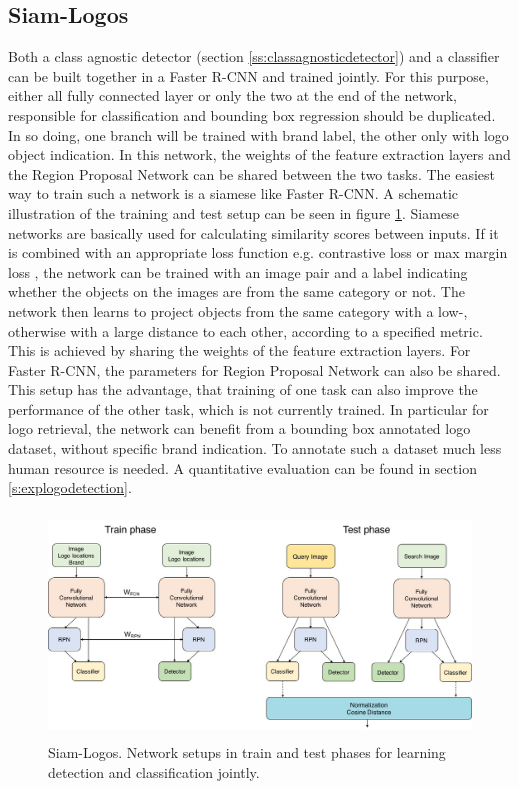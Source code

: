 \subsection{Siam-Logos}\label{ss:solution5}
Both a class agnostic detector (section \ref{ss:classagnosticdetector}) and a classifier can be built together in a Faster R-CNN and trained jointly. For this purpose, either all fully connected layer or only the two at the end of the network, responsible for classification and bounding box regression should be duplicated. In so doing, one branch will be trained with brand label, the other only with logo object indication. In this network, the weights of the feature extraction layers and the Region Proposal Network can be shared between the two tasks. The easiest way to train such a network is a siamese like Faster R-CNN. A schematic illustration of the training and test setup can be seen in figure \ref{f:jointlearning}.
\bigbreak
Siamese networks \cite{Hadsell06dimensionalityreduction} are basically used for calculating similarity scores between inputs. If it is combined with an appropriate loss function e.g. contrastive loss \cite{Hadsell06dimensionalityreduction} or max margin loss \cite{Simonyan13}\cite{ies_2016_herrmann_low_quality}, the network can be trained with an image pair and a label indicating whether the objects on the images are from the same category or not. The network then learns to project objects from the same category with a low-, otherwise with a large distance to each other, according to a specified metric. This is achieved by sharing the weights of the feature extraction layers.
\bigbreak
For Faster R-CNN, the parameters for Region Proposal Network can also be shared. This setup has the advantage, that training of one task can also improve the performance of the other task, which is not currently trained. In particular for logo retrieval, the network can benefit from a bounding box annotated logo dataset, without specific brand indication. To annotate such a dataset much less human resource is needed. A quantitative evaluation can be found in section \ref{s:explogodetection}.
\begin{figure}
  \centering
  \includegraphics[height=60mm]{images/mt/sol5_arch.jpg}
\caption{Siam-Logos. Network setups in train and test phases for learning detection and classification jointly.}
\label{f:jointlearning}
\end{figure}